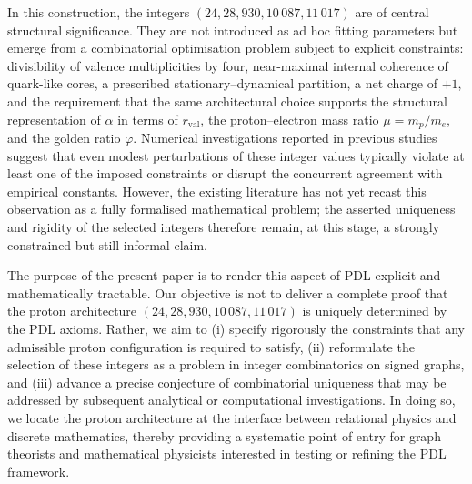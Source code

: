 \documentclass[11pt,a4paper]{article}
\begin{document}
In this construction, the integers $(24,28,930,10\,087,11\,017)$ are of central structural significance. They are not introduced as ad hoc fitting parameters but emerge from a combinatorial optimisation problem subject to explicit constraints: divisibility of valence multiplicities by four, near-maximal internal coherence of quark-like cores, a prescribed stationary–dynamical partition, a net charge of $+1$, and the requirement that the same architectural choice supports the structural representation of $\alpha$ in terms of $r_{\mathrm{val}}$, the proton–electron mass ratio $\mu=m_p/m_e$, and the golden ratio $\varphi$.\cite{LaubscherIntroPDL2026,LaubscherPDLFull2026,LaubscherLDP2026,LaubscherDerivationAlpha2026,LaubscherGoldenRatioPDL2026} Numerical investigations reported in previous studies suggest that even modest perturbations of these integer values typically violate at least one of the imposed constraints or disrupt the concurrent agreement with empirical constants.\cite{LaubscherPDLFull2026,LaubscherLDP2026,LaubscherIMRadPDL2026} However, the existing literature has not yet recast this observation as a fully formalised mathematical problem; the asserted uniqueness and rigidity of the selected integers therefore remain, at this stage, a strongly constrained but still informal claim.

The purpose of the present paper is to render this aspect of PDL explicit and mathematically tractable. Our objective is not to deliver a complete proof that the proton architecture $(24,28,930,10\,087,11\,017)$ is uniquely determined by the PDL axioms. Rather, we aim to (i) specify rigorously the constraints that any admissible proton configuration is required to satisfy, (ii) reformulate the selection of these integers as a problem in integer combinatorics on signed graphs, and (iii) advance a precise conjecture of combinatorial uniqueness that may be addressed by subsequent analytical or computational investigations. In doing so, we locate the proton architecture at the interface between relational physics and discrete mathematics, thereby providing a systematic point of entry for graph theorists and mathematical physicists interested in testing or refining the PDL framework. 
\end{document}
